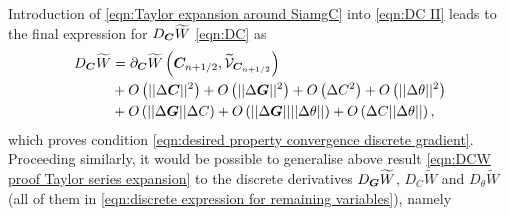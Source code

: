 Introduction of \eqref{eqn:Taylor expansion around SiamgC} into \eqref{eqn:DC II} leads to the final expression for  $D_{\boldsymbol{C}}\widetilde{W}$ \eqref{eqn:DC} as
%
\begin{equation}\label{eqn:DCW proof Taylor series expansion}
\begin{aligned}
D_{\vect{C}}\widetilde{W} & = \partial_{\vect{C}}\widetilde{W}\left(\vect{C}_{n+1/2},\widetilde{\mathcal{V}}_{\vect{C}_{n+1/2}}\right)\\& + 
%
O\left(\vert\vert\Delta\vect{C}\vert\vert^2\right)+ O\left(\vert\vert\Delta\vect{G}\vert\vert^2\right)+
O\left(\Delta{C}^2\right)+
O\left(\vert\vert\Delta\theta\vert\vert^2\right)\\& + 
O\left(\vert\vert\Delta\vect{G}\vert\vert\Delta C\right) + 
O\left(\vert\vert\Delta\vect{G}\vert\vert\vert\vert\Delta\theta\vert\vert\right) 
+ 
O\left(\Delta C\vert\vert\Delta\theta\vert\vert\right),
%
\end{aligned}
\end{equation}
%
which proves condition \eqref{eqn:desired property convergence discrete gradient}. Proceeding similarly, it would be possible to generalise above result \eqref{eqn:DCW proof Taylor series expansion} to the discrete derivatives $D_{\boldsymbol{G}}\widetilde{W}$, $D_C\widetilde{W}$  and $D_{\theta}\widetilde{W}$ (all of them in \eqref{eqn:discrete expression for remaining variables}), namely
%
